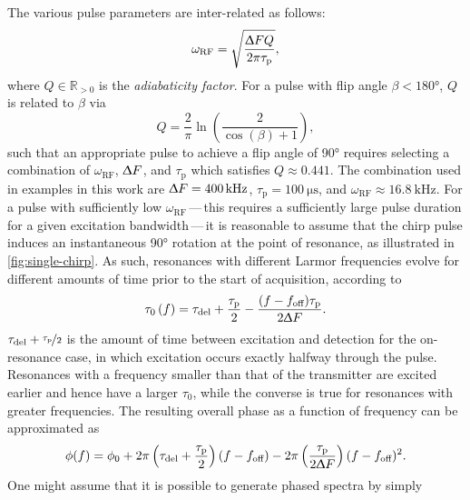 The various pulse parameters are inter-related as
follows\cite{Foroozandeh2019,Kupce1995b}:
\begin{equation}
    \omega_{\text{RF}} = \sqrt{
        \frac{\Updelta F Q}{2 \pi \tau_{\text{p}}}
    },
\end{equation}
where $Q \in \mathbb{R}_{>0}$ is the \emph{adiabaticity factor}.
For a pulse with flip angle  $\beta < \ang{180}$, $Q$ is related to $\beta$ via
\begin{equation}
    Q = \frac{2}{\pi} \ln \left( \frac{2}{\cos(\beta) + 1} \right),
\end{equation}
such that an appropriate pulse to achieve a flip angle of \ang{90} requires
selecting a combination of $\omega_{\text{RF}}$, $\Updelta F$, and
$\tau_{\text{p}}$ which satisfies $Q \approx 0.441$.
The combination used in examples in this work are $\Updelta F =
\qty{400}{\kilo\hertz}$, $\tau_{\text{p}} = \qty{100}{\micro\second}$, and
$\omega_{\text{RF}} \approx \qty{16.8}{\kilo\hertz}$.
For a pulse with sufficiently low $\omega_{\text{RF}}$\,---\,this requires a
sufficiently large pulse duration for a given excitation bandwidth\,---\,it is
reasonable to assume that the chirp pulse induces an instantaneous \ang{90}
rotation at the point of resonance, as illustrated in
\cref{fig:single-chirp}. As such, resonances with different
Larmor frequencies evolve for different amounts of time prior to the start of
acquisition, according to
\begin{equation}
    \tau_0\left(f\right) =
        \tau_{\text{del}} + \frac{\tau_{\text{p}}}{2} -
        \frac{(f - f_{\text{off}}) \tau_{\text{p}}}{2 \Updelta F}.
    \label{eq:t0}
\end{equation}
$\tau_{\text{del}} + \nicefrac{\tau_{\text{p}}}{2}$ is the amount of time
between excitation and detection for the on-resonance case, in which
excitation occurs exactly halfway through the pulse. Resonances
with a frequency smaller than that of the transmitter are excited earlier and hence
have a larger $\tau_0$, while the converse is true for resonances with greater
frequencies. The resulting overall phase as a function of frequency can be
approximated as\cite{Foroozandeh2019}
\begin{equation}
    \phi(f) = \phi_0 + 2 \pi \left(\tau_{\text{del}} + \frac{\tau_{\text{p}}}{2} \right) (f - f_{\text{off}}) -
        2 \pi \left(\frac{\tau_{\text{p}}}{2 \Updelta F}\right)
        (f - f_{\text{off}})^2.
    \label{eq:quadratic-phase}
\end{equation}
One might assume that it is possible to generate phased spectra by simply
